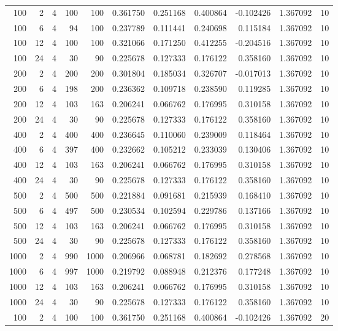 \begin{table}
\begin{tabular}{rrrrrrrrrrr}
100 & 2 & 4 & 100 & 100 & 0.361750 & 0.251168 & 0.400864 & -0.102426 & 1.367092 & 10 \\
100 & 6 & 4 & 94 & 100 & 0.237789 & 0.111441 & 0.240698 & 0.115184 & 1.367092 & 10 \\
100 & 12 & 4 & 100 & 100 & 0.321066 & 0.171250 & 0.412255 & -0.204516 & 1.367092 & 10 \\
100 & 24 & 4 & 30 & 90 & 0.225678 & 0.127333 & 0.176122 & 0.358160 & 1.367092 & 10 \\
200 & 2 & 4 & 200 & 200 & 0.301804 & 0.185034 & 0.326707 & -0.017013 & 1.367092 & 10 \\
200 & 6 & 4 & 198 & 200 & 0.236362 & 0.109718 & 0.238590 & 0.119285 & 1.367092 & 10 \\
200 & 12 & 4 & 103 & 163 & 0.206241 & 0.066762 & 0.176995 & 0.310158 & 1.367092 & 10 \\
200 & 24 & 4 & 30 & 90 & 0.225678 & 0.127333 & 0.176122 & 0.358160 & 1.367092 & 10 \\
400 & 2 & 4 & 400 & 400 & 0.236645 & 0.110060 & 0.239009 & 0.118464 & 1.367092 & 10 \\
400 & 6 & 4 & 397 & 400 & 0.232662 & 0.105212 & 0.233039 & 0.130406 & 1.367092 & 10 \\
400 & 12 & 4 & 103 & 163 & 0.206241 & 0.066762 & 0.176995 & 0.310158 & 1.367092 & 10 \\
400 & 24 & 4 & 30 & 90 & 0.225678 & 0.127333 & 0.176122 & 0.358160 & 1.367092 & 10 \\
500 & 2 & 4 & 500 & 500 & 0.221884 & 0.091681 & 0.215939 & 0.168410 & 1.367092 & 10 \\
500 & 6 & 4 & 497 & 500 & 0.230534 & 0.102594 & 0.229786 & 0.137166 & 1.367092 & 10 \\
500 & 12 & 4 & 103 & 163 & 0.206241 & 0.066762 & 0.176995 & 0.310158 & 1.367092 & 10 \\
500 & 24 & 4 & 30 & 90 & 0.225678 & 0.127333 & 0.176122 & 0.358160 & 1.367092 & 10 \\
1000 & 2 & 4 & 990 & 1000 & 0.206966 & 0.068781 & 0.182692 & 0.278568 & 1.367092 & 10 \\
1000 & 6 & 4 & 997 & 1000 & 0.219792 & 0.088948 & 0.212376 & 0.177248 & 1.367092 & 10 \\
1000 & 12 & 4 & 103 & 163 & 0.206241 & 0.066762 & 0.176995 & 0.310158 & 1.367092 & 10 \\
1000 & 24 & 4 & 30 & 90 & 0.225678 & 0.127333 & 0.176122 & 0.358160 & 1.367092 & 10 \\
100 & 2 & 4 & 100 & 100 & 0.361750 & 0.251168 & 0.400864 & -0.102426 & 1.367092 & 20 \\

\end{tabular}
\end{table}
